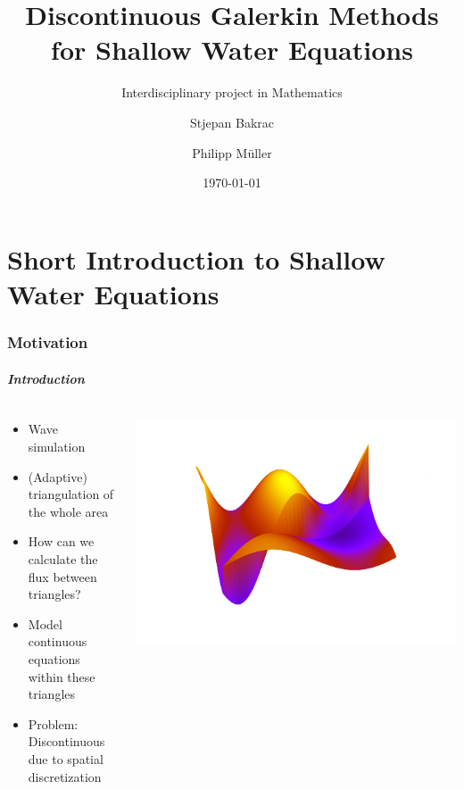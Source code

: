 \documentclass{beamer}
\title[Discont. Galerkin Methods for SWE]{Discontinuous Galerkin Methods for Shallow Water Equations}
\subtitle{Interdisciplinary project in Mathematics}
\author[S. Bakrac, P. Müller]{Stjepan Bakrac \and Philipp Müller}
\date{\today}
\institute[TU München]{Technische Universität München}
\newcommand{\todo}[1]{
  \textcolor{red}{TODO: #1}
  \note{\textcolor{red}{TODO: #1}}
}
\renewcommand{\todo}[1]{}
\begin{document}
\todo{Nicht vergessen, wieder reinzukommentieren!}
\frame{\titlepage}

\part{Short Introduction to Shallow Water Equations}
\label{part:introduction}

\section{Motivation}

\begin{frame}
  \frametitle{Introduction}
  \begin{columns}
    \begin{column}{.5\textwidth}
      \begin{itemize}
      \item Wave simulation
      \item (Adaptive) triangulation of the whole area
      \item How can we calculate the flux between triangles?
      \item Model continuous equations within these triangles
      \item Problem: Discontinuous due to spatial discretization
      \end{itemize}
    \end{column}
  \end{columns}
\end{frame}
\end{document}

